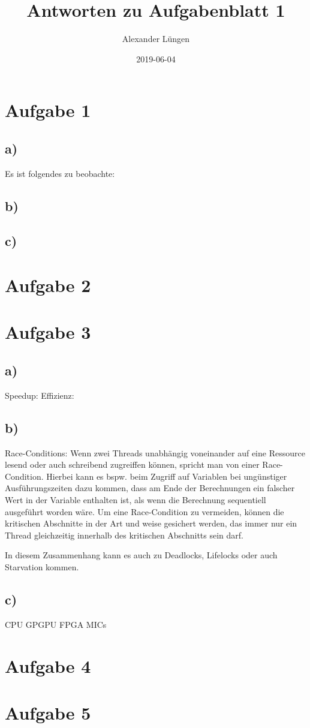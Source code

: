 \documentclass{article}
\title{Antworten zu Aufgabenblatt 1}
\date{2019-06-04}
\author{Alexander Lüngen}
\begin{document}
    \maketitle
    \newpage
    \section{Aufgabe 1}
        \subsection{a)}
        Es ist folgendes zu beobachte:
        \subsection{b)}

        \subsection{c)}

    \section{Aufgabe 2}

    \section{Aufgabe 3}
        \subsection{a)}
        Speedup:
        Effizienz:
        \subsection{b)}
        Race-Conditions: Wenn zwei Threads unabhängig voneinander auf eine Ressource lesend oder auch schreibend zugreiffen können, 
        spricht man von einer Race-Condition. Hierbei kann es bspw. beim Zugriff auf Variablen bei ungünstiger Ausführungszeiten
        dazu kommen, dass am Ende der Berechnungen ein falscher Wert in der Variable enthalten ist, als wenn die Berechnung sequentiell 
        ausgeführt worden wäre.
        Um eine Race-Condition zu vermeiden, können die kritischen Abschnitte in der Art und weise gesichert werden, das immer nur ein 
        Thread gleichzeitig innerhalb des kritischen Abschnitts sein darf.

        In diesem Zusammenhang kann es auch zu Deadlocks, Lifelocks oder auch Starvation kommen. 
        \subsection{c)}
        CPU
        GPGPU
        FPGA
        MICs

    \section{Aufgabe 4}

    \section{Aufgabe 5}
\end{document}
